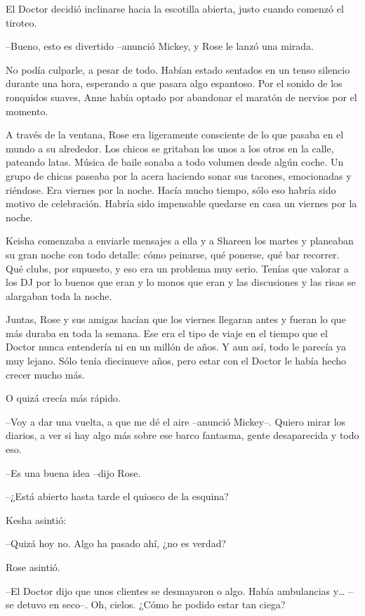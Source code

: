 {El Doctor decidió inclinarse hacia la escotilla abierta, justo cuando
comenzó el tiroteo.}

\mbox{}

{--Bueno, esto es divertido --anunció Mickey, y Rose le lanzó una
mirada.}

{No podía culparle, a pesar de todo. Habían estado sentados en un tenso
 silencio durante una hora, esperando a que pasara algo espantoso. Por el
 sonido de los ronquidos suaves, Anne había optado por abandonar el
maratón de nervios por el momento.}

{A través de la ventana, Rose era ligeramente consciente de lo que
 pasaba en el mundo a su alrededor. Los chicos se gritaban los unos a los
 otros en la calle, pateando latas. Música de baile sonaba a todo volumen
 desde algún coche. Un grupo de chicas paseaba por la acera haciendo
 sonar sus tacones, emocionadas y riéndose. Era viernes por la noche.
 Hacía mucho tiempo, sólo eso habría sido motivo de celebración. Habría
sido impensable quedarse en casa un viernes por la noche.}

{Keisha comenzaba a enviarle mensajes a ella y a Shareen los martes y
 planeaban su gran noche con todo detalle: cómo peinarse, qué ponerse,
 qué bar recorrer. Qué clubs, por supuesto, y eso era un problema muy
 serio. Tenías que valorar a los DJ por lo buenos que eran y lo monos que
eran y las discusiones y las risas se alargaban toda la noche.}

{Juntas, Rose y sus amigas hacían que los viernes llegaran antes y
 fueran lo que más duraba en toda la semana. Ese era el tipo de viaje en
 el tiempo que el Doctor nunca entendería ni en un millón de años. Y aun
 así, todo le parecía ya muy lejano. Sólo tenía diecinueve años, pero
estar con el Doctor le había hecho crecer mucho más.}

{O quizá crecía más rápido.}

{--Voy a dar una vuelta, a que me dé el aire --anunció Mickey--. Quiero
 mirar los diarios, a ver si hay algo más sobre ese barco fantasma, gente
desaparecida y todo eso.}

{--Es una buena idea --dijo Rose.}

{--¿Está abierto hasta tarde el quiosco de la esquina?}

{Kesha asintió:}

{--Quizá hoy no. Algo ha pasado ahí, ¿no es verdad?}

{Rose asintió.}

{--El Doctor dijo que unos clientes se desmayaron o algo. Había
 ambulancias y\ldots{} --se detuvo en seco--. Oh, cielos. ¿Cómo he podido
estar tan ciega?}

